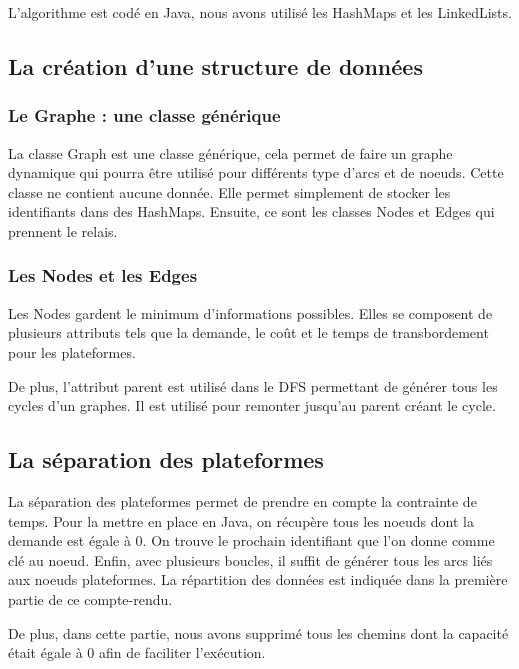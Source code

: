 \documentclass[a4paper,12pt]{article}
\begin{document}
L'algorithme est cod\'e en Java, nous avons utilis\'e les HashMaps et les LinkedLists.

\subsection{La cr\'eation d'une structure de donn\'ees}

\subsubsection{Le Graphe : une classe g\'en\'erique}

La classe Graph est une classe g\'en\'erique, cela permet de faire un graphe dynamique qui pourra \^etre utilis\'e pour diff\'erents type d'arcs et de noeuds. Cette classe ne contient aucune donn\'ee. Elle permet simplement de stocker les identifiants dans des HashMaps. Ensuite, ce sont les classes Nodes et Edges qui prennent le relais.

\subsubsection{Les Nodes et les Edges}

Les Nodes gardent le minimum d'informations possibles. Elles se composent de plusieurs attributs tels que la demande, le co\^ut et le temps de transbordement pour les plateformes.

De plus, l'attribut parent est utilis\'e dans le DFS permettant de g\'en\'erer tous les cycles d'un graphes. Il est utilis\'e pour remonter jusqu'au parent cr\'eant le cycle.

\subsection{La s\'eparation des plateformes}

La s\'eparation des plateformes permet de prendre en compte la contrainte de temps. Pour la mettre en place en Java, on r\'ecup\`ere tous les noeuds dont la demande est \'egale \`a 0. On trouve le prochain identifiant que l'on donne comme cl\'e au noeud. 
Enfin, avec plusieurs boucles, il suffit de g\'en\'erer tous les arcs li\'es aux noeuds plateformes. La r\'epartition des donn\'ees est indiqu\'ee dans la premi\`ere partie de ce compte-rendu.

De plus, dans cette partie, nous avons supprim\'e tous les chemins dont la capacité \'etait \'egale \`a 0 afin de faciliter l'ex\'ecution.
\end{document}
